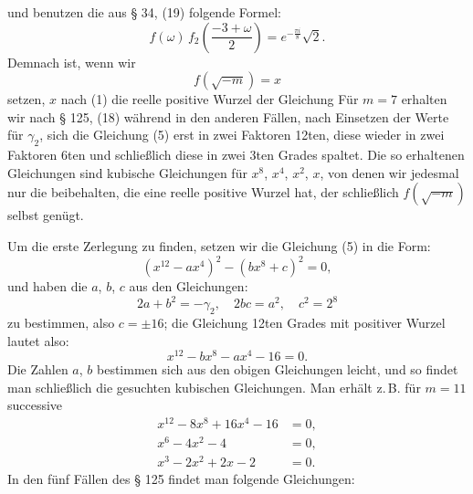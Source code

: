 und benutzen die aus § 34, (19) folgende Formel:
\[
f(\omega)\,f_2\left(\frac{-3+\omega}{2}\right) = e^{-\frac{\pi i}{8}}\sqrt{2}.
\]
Demnach ist, wenn wir
\[
f(\sqrt{-m}) = x
\]
setzen, $x$ nach (1) die reelle positive Wurzel der Gleichung
Für $m = 7$ erhalten wir nach § 125, (18)
während in den anderen Fällen, nach Einsetzen der Werte für $\gamma_2$,
sich die Gleichung (5) erst in zwei Faktoren 12ten, diese wieder
in zwei Faktoren 6ten und schließlich diese in zwei 3ten Grades
spaltet. Die so erhaltenen Gleichungen sind kubische Gleichungen
für $x^8$, $x^4$, $x^2$, $x$, von denen wir jedesmal nur die beibehalten,
die eine reelle positive Wurzel hat, der schließlich $f(\sqrt{-m})$
selbst genügt.

Um die erste Zerlegung zu finden, setzen wir die Gleichung
(5) in die Form:
\[
(x^{12} - a x^4)^2 - (b x^8 + c)^2 = 0,
\]
und haben die  $a$, $b$, $c$ aus den Gleichungen:
\[
2a + b^2 = -\gamma_2, \quad 2bc = a^2, \quad c^2 = 2^8
\]
zu bestimmen, also $c = \pm 16$; die Gleichung 12ten Grades mit
positiver Wurzel lautet also:
\[
x^{12} - b x^8 - a x^4 - 16 = 0.
\]
Die Zahlen $a$, $b$ bestimmen sich aus den obigen Gleichungen
leicht, und so findet man schließlich die gesuchten kubischen
Gleichungen. Man erhält z.\,B. für $m = 11$ successive
\[
\begin{aligned}
x^{12} - 8x^8 + 16x^4 - 16 &= 0,\\
x^6 - 4x^2 - 4 &= 0,\\
x^3 - 2x^2 + 2x - 2 &= 0.
\end{aligned}
\]
In den fünf Fällen des § 125 findet man folgende Gleichungen:
